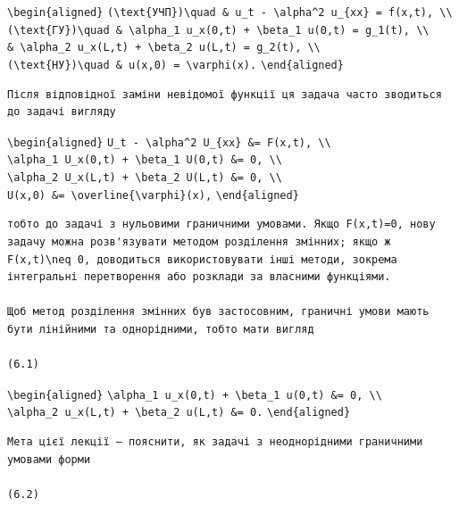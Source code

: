\documentclass[
  ukrainian,
]{article}
\begin{document}
\texttt{\textbackslash{}begin\{aligned\}}
\texttt{(\textbackslash{}text\{УЧП\})\textbackslash{}quad\ \&\ u\_t\ -\ \textbackslash{}alpha\^{}2\ u\_\{xx\}\ =\ f(x,t),\ \textbackslash{}\textbackslash{}}
\texttt{(\textbackslash{}text\{ГУ\})\textbackslash{}quad\ \&\ \textbackslash{}alpha\_1\ u\_x(0,t)\ +\ \textbackslash{}beta\_1\ u(0,t)\ =\ g\_1(t),\ \textbackslash{}\textbackslash{}}
\texttt{\&\ \textbackslash{}alpha\_2\ u\_x(L,t)\ +\ \textbackslash{}beta\_2\ u(L,t)\ =\ g\_2(t),\ \textbackslash{}\textbackslash{}}
\texttt{(\textbackslash{}text\{НУ\})\textbackslash{}quad\ \&\ u(x,0)\ =\ \textbackslash{}varphi(x).}
\texttt{\textbackslash{}end\{aligned\}}

\begin{verbatim}
Після відповідної заміни невідомої функції ця задача часто зводиться до задачі вигляду
\end{verbatim}

\texttt{\textbackslash{}begin\{aligned\}}
\texttt{U\_t\ -\ \textbackslash{}alpha\^{}2\ U\_\{xx\}\ \&=\ F(x,t),\ \textbackslash{}\textbackslash{}}
\texttt{\textbackslash{}alpha\_1\ U\_x(0,t)\ +\ \textbackslash{}beta\_1\ U(0,t)\ \&=\ 0,\ \textbackslash{}\textbackslash{}}
\texttt{\textbackslash{}alpha\_2\ U\_x(L,t)\ +\ \textbackslash{}beta\_2\ U(L,t)\ \&=\ 0,\ \textbackslash{}\textbackslash{}}
\texttt{U(x,0)\ \&=\ \textbackslash{}overline\{\textbackslash{}varphi\}(x),}
\texttt{\textbackslash{}end\{aligned\}}

\begin{verbatim}
тобто до задачі з нульовими граничними умовами. Якщо F(x,t)=0, нову задачу можна розв'язувати методом розділення змінних; якщо ж F(x,t)\neq 0, доводиться використовувати інші методи, зокрема інтегральні перетворення або розклади за власними функціями.

Щоб метод розділення змінних був застосовним, граничні умови мають бути лінійними та однорідними, тобто мати вигляд

(6.1)
\end{verbatim}

\texttt{\textbackslash{}begin\{aligned\}}
\texttt{\textbackslash{}alpha\_1\ u\_x(0,t)\ +\ \textbackslash{}beta\_1\ u(0,t)\ \&=\ 0,\ \textbackslash{}\textbackslash{}}
\texttt{\textbackslash{}alpha\_2\ u\_x(L,t)\ +\ \textbackslash{}beta\_2\ u(L,t)\ \&=\ 0.}
\texttt{\textbackslash{}end\{aligned\}}

\begin{verbatim}
Мета цієї лекції — пояснити, як задачі з неоднорідними граничними умовами форми

(6.2)
\end{verbatim}
\end{document}
